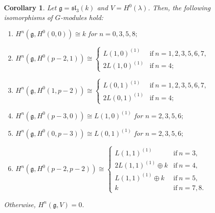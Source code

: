 \documentclass[10pt,a4paper]{amsart}
\numberwithin{equation}{section}
\newtheorem{Corollary}[Theorem]{Corollary}
\begin{document}
\begin{Corollary}\label{c2} Let $\mathfrak{g}=\mathfrak{sl}_3(k)$ and $V=H^0(\lambda)$. Then, the following isomorphisms of $G$-mo\-dules hold:

\begin{enumerate}\itemsep=0pt

\item[$(a)$] $H^n(\mathfrak{g},H^0(0,0))\cong k$ for $n=0,3,5,8;$

\item[$(b)$] $H^n(\mathfrak{g},H^0(p-2,1))\cong
\begin{cases}
L(1,0)^{(1)}&\text{if}\ n=1,2,3,5,6,7,\\
2L(1,0)^{(1)}&\text{if}\ n=4;
\end{cases}$

\item[$(c)$] $H^n(\mathfrak{g},H^0(1,p-2))\cong
\begin{cases}
L(0,1)^{(1)}&\text{if}\ n=1,2,3,5,6,7,\\
2L(0,1)^{(1)}&\text{if}\ n=4;
\end{cases}$

\item[$(d)$] $H^n(\mathfrak{g},H^0(p-3,0))\cong L(1,0)^{(1)}$ for $n=2,3,5,6;$

\item[$(e)$] $H^n(\mathfrak{g},H^0(0,p-3))\cong L(0,1)^{(1)}$ for $n=2,3,5,6;$

\item[$(f)$] $H^n(\mathfrak{g},H^0(p-2,p-2))\cong
\begin{cases}
L(1,1)^{(1)}&\text{if}\ n=3,\\
2L(1,1)^{(1)}\oplus k&\text{if}\ n=4,\\
L(1,1)^{(1)}\oplus k&\text{if}\ n=5,\\
k&\text{if}\ n=7,8.
\end{cases}$
\end{enumerate}
 Otherwise, $H^n(\mathfrak{g},V)=0$.
\end{Corollary}
\end{document}
